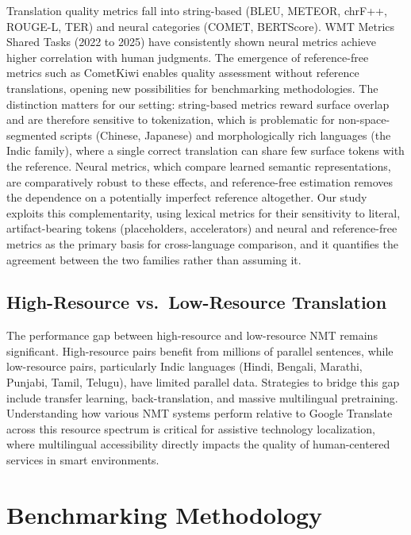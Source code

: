 \documentclass[Afour,sagev,times,doublespace]{sagej}
\begin{document}
Translation quality metrics fall into string-based (BLEU,\cite{19} METEOR,\cite{20} chrF++,\cite{21} ROUGE-L,\cite{22} TER\cite{23}) and neural categories (COMET,\cite{24} BERTScore\cite{25}).\cite{26} WMT Metrics Shared Tasks (2022 to 2025) have consistently shown neural metrics achieve higher correlation with human judgments.\cite{26} The emergence of reference-free metrics such as CometKiwi enables quality assessment without reference translations, opening new possibilities for benchmarking methodologies. The distinction matters for our setting: string-based metrics reward surface overlap and are therefore sensitive to tokenization, which is problematic for non-space-segmented scripts (Chinese, Japanese) and morphologically rich languages (the Indic family), where a single correct translation can share few surface tokens with the reference. Neural metrics, which compare learned semantic representations, are comparatively robust to these effects, and reference-free estimation removes the dependence on a potentially imperfect reference altogether. Our study exploits this complementarity, using lexical metrics for their sensitivity to literal, artifact-bearing tokens (placeholders, accelerators) and neural and reference-free metrics as the primary basis for cross-language comparison, and it quantifies the agreement between the two families rather than assuming it.

\subsection{High-Resource vs.\ Low-Resource Translation}

The performance gap between high-resource and low-resource NMT remains significant.\cite{16,17} High-resource pairs benefit from millions of parallel sentences, while low-resource pairs, particularly Indic languages (Hindi, Bengali, Marathi, Punjabi, Tamil, Telugu), have limited parallel data.\cite{16} Strategies to bridge this gap include transfer learning, back-translation, and massive multilingual pretraining.\cite{16} Understanding how various NMT systems perform relative to Google Translate across this resource spectrum is critical for assistive technology localization, where multilingual accessibility directly impacts the quality of human-centered services in smart environments.

\section{Benchmarking Methodology}
\end{document}
